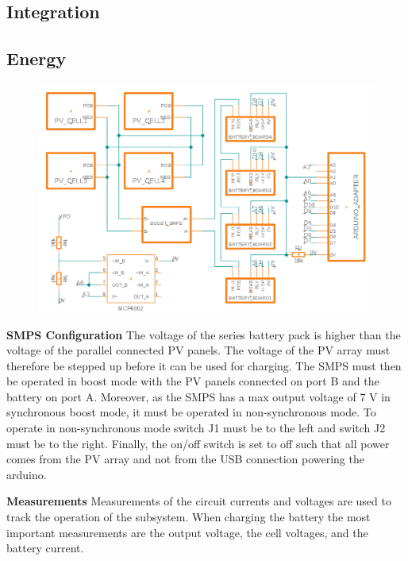 \documentclass[a4paper]{article}
\begin{document}
\subsection{Integration}


\subsection{Energy}
\begin{figure}[H]
    \centering
    \includegraphics[width=\textwidth]{Circuit_Diagram.png}
    \label{fig:circuitDiagram}
\end{figure}

\textbf{SMPS Configuration}
\vspace{10pt} 
\newline
The voltage of the series battery pack is higher than the voltage of the parallel connected
PV panels. The voltage of the PV array must therefore be stepped up before it can be used
for charging. The SMPS must then be operated in boost mode with the
PV panels connected on port B and the battery on port A. Moreover, as the 
SMPS has a max output voltage of 7 V in synchronous boost mode\cite{powerLogbook}, 
it must be operated in non-synchronous mode. To operate in non-synchronous mode switch J1
must be to the left and switch J2 must be to the right. Finally, the on/off switch is 
set to off such that all power comes from the PV array and not from the USB connection 
powering the arduino.

\textbf{Measurements}
\vspace{10pt} 
\newline
Measurements of the circuit currents and voltages are used to track the operation of the
subsystem. When charging the battery the most important measurements are the output voltage,
the cell voltages, and the battery current.
\end{document}
